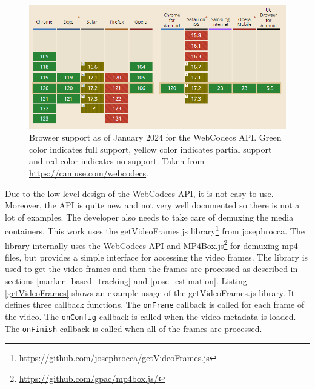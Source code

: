 \begin{figure}[htbp]
    \centering
    \includegraphics[width=\textwidth]{obrazky-figures/caniuseWebcodecs.png}
    \caption{Browser support as of January 2024 for the WebCodecs API. Green color indicates full support, yellow color indicates partial support and red color indicates no support. Taken from \url{https://caniuse.com/webcodecs}.}
    \label{fig:caniuseWebcodecs}
\end{figure}

Due to the low-level design of the WebCodecs API, it is not easy to use. Moreover, the API is quite new and not very well documented so there is not a lot of examples. The developer also needs to take care of demuxing the media containers. This work uses the getVideoFrames.js library\footnote{\url{https://github.com/josephrocca/getVideoFrames.js}} from josephrocca. The library internally uses the WebCodecs API and MP4Box.js\footnote{\url{https://github.com/gpac/mp4box.js/}} for demuxing mp4 files, but provides a simple interface for accessing the video frames. The library is used to get the video frames and then the frames are processed as described in sections \ref{marker_based_tracking} and \ref{pose_estimation}. Listing \ref{getVideoFrames} shows an example usage of the getVideoFrames.js library. It defines three callback functions. The \texttt{onFrame} callback is called for each frame of the video. The \texttt{onConfig} callback is called when the video metadata is loaded. The \texttt{onFinish} callback is called when all of the frames are processed.

